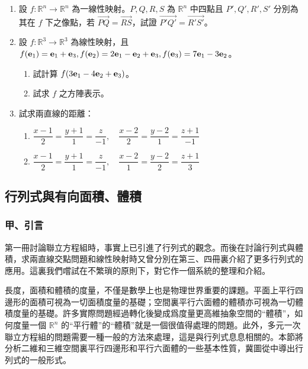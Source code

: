 \begin{enumerate}[label=\arabic*., leftmargin=2em]
  \item[\textbf{**29.}] 設 $f: \mathbb{R}^n \longrightarrow \mathbb{R}^n$ 為一線性映射。$P, Q, R, S$ 為 $\mathbb{R}^n$ 中四點且 $P', Q', R', S'$ 分別為其在 $f$ 下之像點，若 $\vec{PQ} = \vec{RS}$，試證 $\vec{P'Q'} = \vec{R'S'}$。

  \item 設 $f: \mathbb{R}^3 \longrightarrow \mathbb{R}^3$ 為線性映射，且 $f(\boldsymbol{\mathbf{e}}_1) = \boldsymbol{\mathbf{e}}_1 + \boldsymbol{\mathbf{e}}_3, f(\boldsymbol{\mathbf{e}}_2) = 2\boldsymbol{\mathbf{e}}_1 - \boldsymbol{\mathbf{e}}_2 + \boldsymbol{\mathbf{e}}_3, f(\boldsymbol{\mathbf{e}}_3) = 7\boldsymbol{\mathbf{e}}_1 - 3\boldsymbol{\mathbf{e}}_2$。
  \begin{enumerate}[label=(\alph*)]
    \item 試計算 $f(3\boldsymbol{\mathbf{e}}_1 - 4\boldsymbol{\mathbf{e}}_2 + \boldsymbol{\mathbf{e}}_3)$。
    \item 試求 $f$ 之方陣表示。
  \end{enumerate}

  \item[\textbf{*31.}] 試求兩直線的距離：
  \begin{enumerate}[label=(\alph*)]
    \item $\dfrac{x-1}{2} = \dfrac{y+1}{1} = \dfrac{z}{-1}, \quad \dfrac{x-2}{2} = \dfrac{y-2}{1} = \dfrac{z+1}{-1}$
    \item $\dfrac{x-1}{2} = \dfrac{y+1}{1} = \dfrac{z}{-1}, \quad \dfrac{x-2}{1} = \dfrac{y-2}{2} = \dfrac{z+1}{3}$
  \end{enumerate}
\end{enumerate}

\subsection{行列式與有向面積、體積}\label{sec:b6-1-2}
\resetsectcounters

\subsubsection*{甲、引言}\label{subsec:b6-1-2-a}

第一冊討論聯立方程組時，事實上已引進了行列式的觀念。而後在討論行列式與體積，求兩直線交點問題和線性映射時又曾分別在第三、四冊裏介紹了更多行列式的應用。這裏我們嚐試在不繁瑣的原則下，對它作一個系統的整理和介紹。

長度，面積和體積的度量，不僅是數學上也是物理世界重要的課題。平面上平行四邊形的面積可視為一切面積度量的基礎；空間裏平行六面體的體積亦可視為一切體積度量的基礎。許多實際問題經過轉化後變成爲度量更高維抽象空間的“體積”，如何度量一個 $\mathbb{R}^n$ 的“平行體”的“體積”就是一個很值得處理的問題。此外，多元一次聯立方程組的問題需要一種一般的方法來處理，這是與行列式息息相關的。本節將分析二維和三維空間裏平行四邊形和平行六面體的一些基本性質，冀圖從中導出行列式的一般形式。

